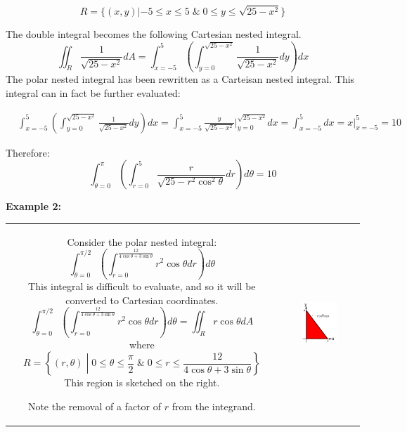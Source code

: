 \documentclass{article}
\begin{document}
\[R = \{(x,y) | -5 \leq x \leq 5 \;\&\; 0 \leq y \leq \sqrt{25 - x^2}\}\] 

The double integral becomes the following Cartesian nested integral. 
\[\iint_R \frac{1}{\sqrt{25 - x^2}} dA = \int_{x = -5}^{5} \left(\int_{y = 0}^{\sqrt{25 - x^2}} \frac{1}{\sqrt{25 - x^2}} dy\right)dx\]
The polar nested integral has been rewritten as a Carteisan nested integral. This integral can in fact be further evaluated:

\begin{align*}
& \int_{x = -5}^{5} \left(\int_{y = 0}^{\sqrt{25 - x^2}} \frac{1}{\sqrt{25 - x^2}} dy\right)dx 
= \int_{x = -5}^{5} \frac{y}{\sqrt{25 - x^2}}\Big|_{y = 0}^{\sqrt{25 - x^2}} dx 
= \int_{x = -5}^{5} dx 
= x\Big|_{x = -5}^{5}
= 10
\end{align*}

Therefore:
\[\int_{\theta = 0}^{\pi} \left(\int_{r = 0}^{5} \frac{r}{\sqrt{25 - r^2\cos^2\theta}} dr\right)d\theta = 10\] 





\vspace{5mm}

\textbf{Example 2:}

\vspace{5mm}

\begin{tabular}{cc}
\parbox{0.5\textwidth}{
Consider the polar nested integral:
\[\int_{\theta = 0}^{\pi/2} \left(\int_{r = 0}^{\frac{12}{4\cos\theta + 3\sin\theta}} r^2\cos\theta dr\right)d\theta\] 
This integral is difficult to evaluate, and so it will be converted to Cartesian coordinates. 
\[\int_{\theta = 0}^{\pi/2} \left(\int_{r = 0}^{\frac{12}{4\cos\theta + 3\sin\theta}} r^2\cos\theta dr\right)d\theta = \iint_R r\cos\theta dA\] 
where 
\[R = \left\{(r,\theta) \middle| 0 \leq \theta \leq \frac{\pi}{2} \;\&\; 0 \leq r \leq \frac{12}{4\cos\theta + 3\sin\theta} \right\}\]
This region is sketched on the right. 

Note the removal of a factor of \(r\) from the integrand.
} & \parbox{0.5\textwidth}{
\includegraphics[width = 0.5\textwidth]{Polar_region_5}
}
\end{tabular}
\end{document}

